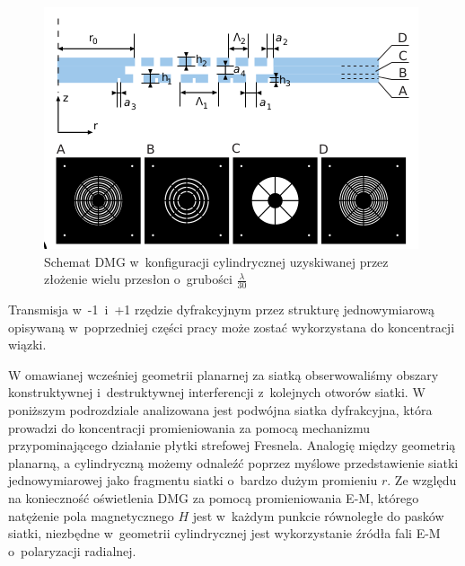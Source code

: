 \begin{figure}
	\includegraphics[width=\textwidth]{images/dmg/express_siatki.png}
	\caption{Schemat DMG w~konfiguracji cylindrycznej uzyskiwanej przez złożenie wielu przesłon o~grubości $\frac{\lambda}{30}$ \cite{Yavorskiy:14}}
	\label{fig:schem-cyl}
\end{figure}

Transmisja w~-1~i~+1 rzędzie dyfrakcyjnym przez strukturę jednowymiarową opisywaną w~poprzedniej części pracy może zostać wykorzystana do koncentracji wiązki. 

W omawianej wcześniej geometrii planarnej za siatką obserwowaliśmy obszary konstruktywnej i~destruktywnej interferencji z~kolejnych otworów siatki. W poniższym podrozdziale analizowana jest podwójna siatka dyfrakcyjna, która prowadzi do koncentracji promieniowania za pomocą mechanizmu przypominającego działanie płytki strefowej Fresnela. Analogię między geometrią planarną, a cylindryczną możemy odnaleźć poprzez myślowe przedstawienie siatki jednowymiarowej jako fragmentu siatki o~bardzo dużym promieniu $r$. Ze względu na konieczność oświetlenia DMG za pomocą promieniowania E-M, którego natężenie pola magnetycznego $H$ jest w~każdym punkcie równoległe do pasków siatki, niezbędne w~geometrii cylindrycznej jest wykorzystanie źródła fali E-M o~polaryzacji radialnej. 


